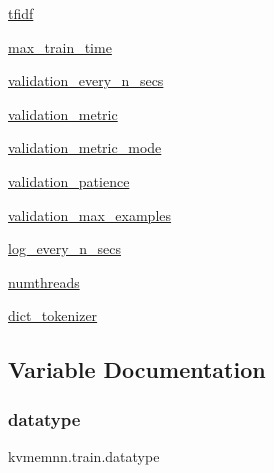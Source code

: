 \begin{DoxyCompactItemize}
\hyperlink{namespacekvmemnn_1_1train_a2c7299b84bf75444cf60d2b443b702d0}{tfidf}
\item 
\hyperlink{namespacekvmemnn_1_1train_aa84f2c4c3f35ef5c480f8ed3e624810e}{max\+\_\+train\+\_\+time}
\item 
\hyperlink{namespacekvmemnn_1_1train_af2418cf1d9464fdd65120d87197b2d6e}{validation\+\_\+every\+\_\+n\+\_\+secs}
\item 
\hyperlink{namespacekvmemnn_1_1train_a5028d0e27c4d754e1ac984c7e7cb38ac}{validation\+\_\+metric}
\item 
\hyperlink{namespacekvmemnn_1_1train_af389be1829c1f2195335c6c3e2dc2f9f}{validation\+\_\+metric\+\_\+mode}
\item 
\hyperlink{namespacekvmemnn_1_1train_a4bd19aecad4623576f79948e32937e5c}{validation\+\_\+patience}
\item 
\hyperlink{namespacekvmemnn_1_1train_a646a63480fc3acbd02ee1f0bdde114f6}{validation\+\_\+max\+\_\+examples}
\item 
\hyperlink{namespacekvmemnn_1_1train_a331673e8cb8de3d40ff2599caf2cea5a}{log\+\_\+every\+\_\+n\+\_\+secs}
\item 
\hyperlink{namespacekvmemnn_1_1train_abdc5e71f35132f2f4a0f83704827fa00}{numthreads}
\item 
\hyperlink{namespacekvmemnn_1_1train_a3bd0180bed95becb58cb03e4fafe6a5f}{dict\+\_\+tokenizer}
\end{DoxyCompactItemize}


\subsection{Variable Documentation}
\mbox{\label{namespacekvmemnn_1_1train_a11027f4fb15005cd3f2470d81d7d093f}} 
\subsubsection{\texorpdfstring{datatype}{datatype}}
{\footnotesize\ttfamily kvmemnn.\+train.\+datatype}

\mbox{\label{namespacekvmemnn_1_1train_ab09dbdf5a90c6dd383946655b1a73558}} 
